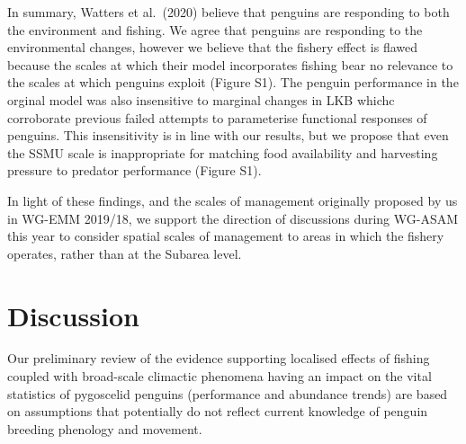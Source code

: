 \documentclass[]{elsarticle} %
\begin{document}
In summary, Watters et al.~(2020) believe that penguins are responding
to both the environment and fishing. We agree that penguins are
responding to the environmental changes, however we believe that the
fishery effect is flawed because the scales at which their model
incorporates fishing bear no relevance to the scales at which penguins
exploit (Figure S1). The penguin performance in the orginal model was
also insensitive to marginal changes in LKB whichc corroborate previous
failed attempts to parameterise functional responses of penguins. This
insensitivity is in line with our results, but we propose that even the
SSMU scale is inappropriate for matching food availability and
harvesting pressure to predator performance (Figure S1).

In light of these findings, and the scales of management originally
proposed by us in WG-EMM 2019/18, we support the direction of
discussions during WG-ASAM this year to consider spatial scales of
management to areas in which the fishery operates, rather than at the
Subarea level.

\begin{table}[ht]
\centering
{}
\caption{Summary Table showing what was bullshit, and where to find the analysis and data in our paper.}
\end{table}

\section{Discussion}\label{discussion}

Our preliminary review of the evidence supporting localised effects of
fishing coupled with broad-scale climactic phenomena having an impact on
the vital statistics of pygoscelid penguins (performance and abundance
trends) are based on assumptions that potentially do not reflect current
knowledge of penguin breeding phenology and movement.
\end{document}
